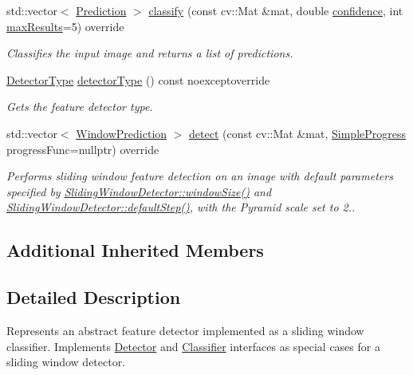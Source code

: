 \begin{DoxyCompactItemize}
std\+::vector$<$ \hyperlink{structdg_1_1deepcore_1_1classification_1_1_prediction}{Prediction} $>$ \hyperlink{classdg_1_1deepcore_1_1classification_1_1_sliding_window_detector_ad68cd98a39fdab57c9de0ad0e3153f45}{classify} (const cv\+::\+Mat \&mat, double \hyperlink{group___classification_module_ga11004d28f6b88023d1ae1bed44261dc9}{confidence}, int \hyperlink{group___classification_module_gae2a1d191924996f7d3d0673b8c2da35d}{max\+Results}=5) override
\begin{DoxyCompactList}\small\item\em Classifies the input image and returns a list of predictions. \end{DoxyCompactList}\item 
\hyperlink{group___classification_module_ga9fa0b4fe3495e513c3c0746aa0940f41}{Detector\+Type} \hyperlink{classdg_1_1deepcore_1_1classification_1_1_sliding_window_detector_a0897f20b003a4e70066e1cd69ea98c66}{detector\+Type} () const noexceptoverride
\begin{DoxyCompactList}\small\item\em Gets the feature detector type. \end{DoxyCompactList}\item 
std\+::vector$<$ \hyperlink{structdg_1_1deepcore_1_1classification_1_1_window_prediction}{Window\+Prediction} $>$ \hyperlink{group___classification_module_gaf9e9535cf11f5961389a5271248062cb}{detect} (const cv\+::\+Mat \&mat, \hyperlink{group___utility_module_ga6763018df79e4bdbcd8cd14cea5342b2}{Simple\+Progress} progress\+Func=nullptr) override
\begin{DoxyCompactList}\small\item\em Performs sliding window feature detection on an image with default parameters specified by \hyperlink{group___classification_module_ga35c268eb743bfbfb5d77d30ddbcc48e5}{Sliding\+Window\+Detector\+::window\+Size()} and \hyperlink{group___classification_module_ga8e430c585fe3d3bcba00c21f418752d2}{Sliding\+Window\+Detector\+::default\+Step()}, with the Pyramid scale set to 2.. \end{DoxyCompactList}\end{DoxyCompactItemize}
\subsection*{Additional Inherited Members}


\subsection{Detailed Description}
Represents an abstract feature detector implemented as a sliding window classifier. Implements \hyperlink{classdg_1_1deepcore_1_1classification_1_1_detector}{Detector} and \hyperlink{classdg_1_1deepcore_1_1classification_1_1_classifier}{Classifier} interfaces as special cases for a sliding window detector. 

